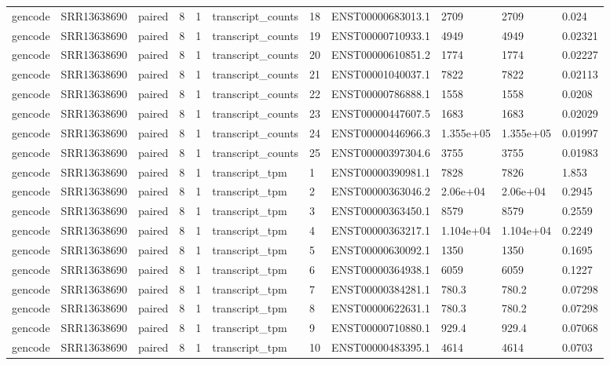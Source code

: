 \begin{tabular}{lllllllllll}
gencode & SRR13638690 & paired & 8 & 1 & transcript\_counts & 18 & ENST00000683013.1 & 2709 & 2709 & 0.024 \\
gencode & SRR13638690 & paired & 8 & 1 & transcript\_counts & 19 & ENST00000710933.1 & 4949 & 4949 & 0.02321 \\
gencode & SRR13638690 & paired & 8 & 1 & transcript\_counts & 20 & ENST00000610851.2 & 1774 & 1774 & 0.02227 \\
gencode & SRR13638690 & paired & 8 & 1 & transcript\_counts & 21 & ENST00001040037.1 & 7822 & 7822 & 0.02113 \\
gencode & SRR13638690 & paired & 8 & 1 & transcript\_counts & 22 & ENST00000786888.1 & 1558 & 1558 & 0.0208 \\
gencode & SRR13638690 & paired & 8 & 1 & transcript\_counts & 23 & ENST00000447607.5 & 1683 & 1683 & 0.02029 \\
gencode & SRR13638690 & paired & 8 & 1 & transcript\_counts & 24 & ENST00000446966.3 & 1.355e+05 & 1.355e+05 & 0.01997 \\
gencode & SRR13638690 & paired & 8 & 1 & transcript\_counts & 25 & ENST00000397304.6 & 3755 & 3755 & 0.01983 \\
gencode & SRR13638690 & paired & 8 & 1 & transcript\_tpm & 1 & ENST00000390981.1 & 7828 & 7826 & 1.853 \\
gencode & SRR13638690 & paired & 8 & 1 & transcript\_tpm & 2 & ENST00000363046.2 & 2.06e+04 & 2.06e+04 & 0.2945 \\
gencode & SRR13638690 & paired & 8 & 1 & transcript\_tpm & 3 & ENST00000363450.1 & 8579 & 8579 & 0.2559 \\
gencode & SRR13638690 & paired & 8 & 1 & transcript\_tpm & 4 & ENST00000363217.1 & 1.104e+04 & 1.104e+04 & 0.2249 \\
gencode & SRR13638690 & paired & 8 & 1 & transcript\_tpm & 5 & ENST00000630092.1 & 1350 & 1350 & 0.1695 \\
gencode & SRR13638690 & paired & 8 & 1 & transcript\_tpm & 6 & ENST00000364938.1 & 6059 & 6059 & 0.1227 \\
gencode & SRR13638690 & paired & 8 & 1 & transcript\_tpm & 7 & ENST00000384281.1 & 780.3 & 780.2 & 0.07298 \\
gencode & SRR13638690 & paired & 8 & 1 & transcript\_tpm & 8 & ENST00000622631.1 & 780.3 & 780.2 & 0.07298 \\
gencode & SRR13638690 & paired & 8 & 1 & transcript\_tpm & 9 & ENST00000710880.1 & 929.4 & 929.4 & 0.07068 \\
gencode & SRR13638690 & paired & 8 & 1 & transcript\_tpm & 10 & ENST00000483395.1 & 4614 & 4614 & 0.0703 \\

\end{tabular}
